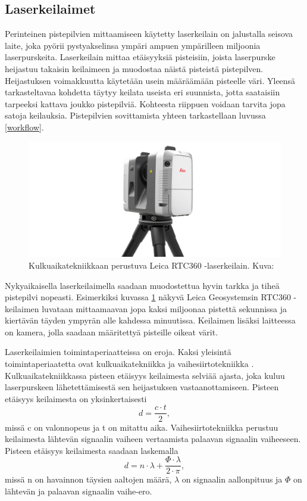 \subsection{Laserkeilaimet}\label{laserkeilaimet}

Perinteinen pistepilvien mittaamiseen käytetty laserkeilain on jalustalla seisova laite, joka pyörii pystyakselinsa ympäri ampuen ympärilleen miljoonia laserpurskeita. Laserkeilain mittaa etäisyyksiä pisteisiin, joista laserpurske heijastuu takaisin keilaimeen ja muodostaa näistä pisteistä pistepilven. Heijastuksen voimakkuutta käytetään usein määräämään pisteelle väri. Yleensä tarkasteltavaa kohdetta täytyy keilata useista eri suunnista, jotta saataisiin tarpeeksi kattava joukko pistepilviä. Kohteesta riippuen voidaan tarvita jopa satoja keilauksia. Pistepilvien sovittamista yhteen tarkastellaan luvussa \ref{workflow}.

\begin{figure}
    \centering
    \includegraphics[width=0.7\paperwidth]{img/leica.jpg}
    \caption{Kulkuaikatekniikkaan perustuva Leica RTC360 -laserkeilain. Kuva: \cite{skannerikuva}}
    \label{leica}
\end{figure}

Nykyaikaisella laserkeilaimella saadaan muodostettua hyvin tarkka ja tiheä pistepilvi nopeasti. Esimerkiksi kuvassa \ref{leica} näkyvä Leica Geosystemsin RTC360 -keilaimen luvataan mittaamaavan jopa kaksi miljoonaa pistettä sekunnissa ja kiertävän täyden ympyrän alle kahdessa minuutissa. Keilaimen lisäksi laitteessa on kamera, jolla saadaan määritettyä pisteille oikeat värit. \cite{leica} 

Laserkeilaimien toimintaperiaatteissa on eroja. Kaksi yleisintä toimintaperiaatetta ovat kulkuaikatekniikka  ja vaihesiirtotekniikka . Kulkuaikatekniikkassa pisteen etäisyys keilaimesta selviää ajasta, joka kuluu laserpurskeen lähetettämisestä sen heijastuksen vastaanottamiseen. Pisteen etäisyys keilaimesta on yksinkertaisesti 
\begin{equation}
    d=\frac{c\cdot t}{2},    
\end{equation}
missä c on valonnopeus ja t on mitattu aika. \cite{fabritius}   
Vaihesiirtotekniikka perustuu keilaimesta lähtevän signaalin vaiheen vertaamista palaavan signaalin vaiheeseen. Pisteen etäisyys keilaimesta saadaan laskemalla 
\begin{equation}
    d=n\cdot \lambda + \frac{\Phi \cdot \lambda}{2 \cdot \pi},
\end{equation}
missä n on havainnon täysien aaltojen määrä, $\lambda$ on signaalin aallonpituus ja $\Phi$ on lähtevän ja palaavan signaalin vaihe-ero. \cite{fabritius}

